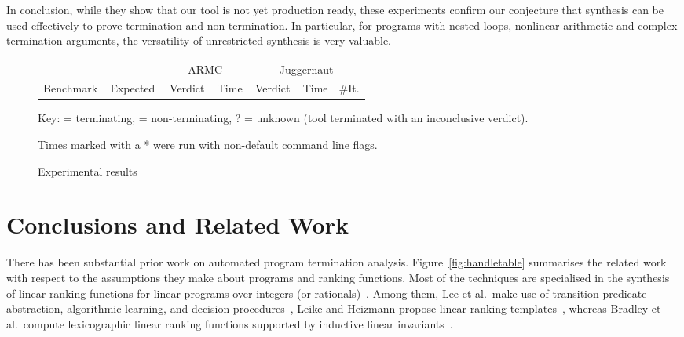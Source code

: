 \documentclass[preprint]{sigplanconf}
\theoremstyle{definition}
\newcommand{\xmark}{\ding{55}}
\newcommand{\tick}{\checkmark}
\begin{document}
In conclusion, while they show that our tool is not yet production ready,
these experiments confirm our conjecture that synthesis can be used
effectively to prove termination and non-termination.  In particular,
for programs with nested loops, nonlinear arithmetic and complex
termination arguments, the versatility of unrestricted synthesis
is very valuable.

\begin{figure}
\centering
\scriptsize
\begin{tabular}{|l|@{}c@{}||@{}c@{}|r||@{}c@{}|r|r|}
\hline
          &             & \multicolumn{2}{|c||}{\sc ARMC} & \multicolumn{3}{|c|}{\sc Juggernaut} \\
Benchmark & \,Expected\, & \,Verdict\, & Time & \,Verdict\, & Time & \#It.\\
    \hline
    \hline

    \hline
\end{tabular}

Key: \tick = terminating, \xmark = non-terminating, ? = unknown (tool terminated with an inconclusive verdict).

Times marked with a * were run with non-default command line flags.

\caption{Experimental results\label{fig:experiments}}
 \end{figure}

\section{Conclusions and Related Work}

There has been substantial prior work on automated program termination
analysis.  Figure~\ref{fig:handletable} summarises the related work with
respect to the assumptions they make about programs and ranking functions. 
Most of the techniques are specialised in the synthesis of linear ranking
functions for linear programs over integers (or
rationals)~\cite{DBLP:conf/pldi/CookPR06, DBLP:conf/cav/LeeWY12,
DBLP:conf/popl/Ben-AmramG13, DBLP:conf/vmcai/P04,
DBLP:conf/atva/HeizmannHLP13, DBLP:conf/cav/BradleyMS05,
DBLP:conf/tacas/CookSZ13, DBLP:conf/cav/KroeningSTW10}.  Among them, Lee et
al.~make use of transition predicate abstraction, algorithmic learning, and
decision procedures~\cite{DBLP:conf/cav/LeeWY12}, Leike and Heizmann propose
linear ranking templates~\cite{DBLP:conf/tacas/LeikeH14}, whereas Bradley et
al.~compute lexicographic linear ranking functions supported by inductive
linear invariants~\cite{DBLP:conf/cav/BradleyMS05}.
\end{document}
